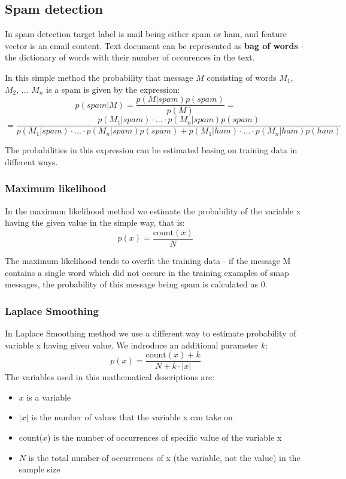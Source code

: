 \documentclass[a4paper,10pt]{article}
\begin{document}
\subsection{Spam detection}

In spam detection target label is mail being either spam or ham, and feature vector is an email content. Text document can be represented as \textbf{bag of words} - the dictionary of words with their number of occurences in the text.

In this simple method the probability that message $M$ consisting of words $M_1$, $M_2$, ... $M_n$ is a spam is given by the expression:
\[ p(spam|M) = \frac{p(M|spam)p(spam)}{p(M)} = \]
\[ = \frac{p(M_1|spam)\cdot ...\cdot p(M_n|spam)p(spam)}{p(M_1|spam)\cdot ...\cdot p(M_n|spam)p(spam) + p(M_1|ham)\cdot ...\cdot p(M_n|ham)p(ham)}  \]

The probabilities in this expression can be estimated basing on training data in different ways.

\subsubsection*{Maximum likelihood}

In the maximum likelihood method we estimate the probability of the variable x having the given value in the simple way, that is:
\[p(x) = \frac{\mathrm{count}(x)}{N} \]

The maximum likelihood tends to overfit the training data - if the message M contains a single word which did not occure in the training examples of smap messages, the probability of this message being spam is calculated as 0.


\subsubsection*{Laplace Smoothing}

In Laplace Smoothing method we use a different way to estimate probability of variable x having given value. We indroduce an additional parameter $k$:
\[ p(x) = \frac{\mathrm{count}(x)+k}{N+k\cdot |x|} \]
The variables used in this mathematical descriptions are:
\begin{itemize}
\setlength{\itemsep}{0pt}
\setlength{\parskip}{0pt}
\setlength{\parsep}{0pt}
\item $x$ is a variable
\item $|x|$ is the number of values that the variable x can take on
\item count($x$) is the number of occurrences of specific value of the variable x
\item $N$ is the total number of occurrences of x (the variable, not the value) in the sample size
\end{itemize}
\end{document}
